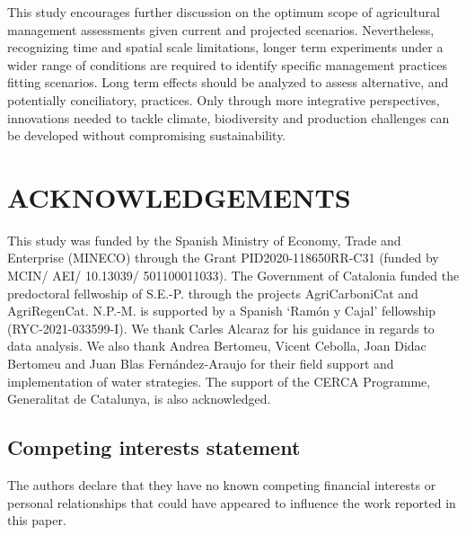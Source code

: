 This study encourages further discussion on the optimum scope of agricultural management assessments given current and projected scenarios. Nevertheless, recognizing time and spatial scale limitations, longer term experiments under a wider range of conditions are required to identify specific management practices fitting scenarios. Long term effects should be analyzed to assess alternative, and potentially conciliatory, practices. Only through more integrative perspectives, innovations needed to tackle climate, biodiversity and production challenges can be developed without compromising sustainability.\\

\section*{ACKNOWLEDGEMENTS}
\label{sec:ackn}

This study was funded by the Spanish Ministry of Economy, Trade and Enterprise (MINECO) through the Grant PID2020-118650RR-C31 (funded by MCIN/ AEI/ 10.13039/ 501100011033). The Government of Catalonia funded the predoctoral fellwoship of S.E.-P. through the projects AgriCarboniCat and AgriRegenCat. N.P.-M. is supported by a Spanish ‘Ramón y Cajal’ fellowship (RYC-2021-033599-I). We thank Carles Alcaraz for his guidance in regards to data analysis. We also thank Andrea Bertomeu, Vicent Cebolla, Joan Didac Bertomeu and Juan Blas Fernández-Araujo for their field support and implementation of water strategies. The support of the CERCA Programme, Generalitat de Catalunya, is also acknowledged.

\subsection*{Competing interests statement}
\label{sec:interests}

The authors declare that they have no known competing financial
interests or personal relationships that could have appeared to influence the work reported in this paper.

 

\pagebreak

%

